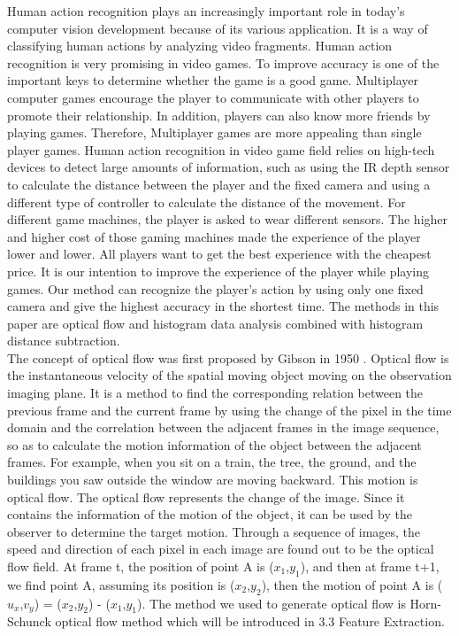 \documentclass[runningheads,a4paper]{llncs}
\begin{document}
	Human action recognition plays an increasingly important role in today’s computer vision development because of its various application. It is a way of classifying human actions by analyzing video fragments. Human action recognition is very promising in video games. To improve accuracy is one of the important keys to determine whether the game is a good game. Multiplayer computer games encourage the player to communicate with other players to promote their relationship. In addition, players can also know more friends by playing games. Therefore, Multiplayer games are more appealing than single player games. Human action recognition in video game field relies on high-tech devices to detect large amounts of information, such as using the IR depth sensor to calculate the distance between the player and the fixed camera and using a different type of controller to calculate the distance of the movement. For different game machines, the player is asked to wear different sensors. The higher and higher cost of those gaming machines made the experience of the player lower and lower. All players want to get the best experience with the cheapest price. It is our intention to improve the experience of the player while playing games. Our method can recognize the player’s action by using only one fixed camera and give the highest accuracy in the shortest time. The methods in this paper are optical flow and histogram data analysis combined with histogram distance subtraction.\\
	The concept of optical flow was first proposed by Gibson in 1950 \cite{2}. Optical flow is the instantaneous velocity of the spatial moving object moving on the observation imaging plane. It is a method to find the corresponding relation between the previous frame and the current frame by using the change of the pixel in the time domain and the correlation between the adjacent frames in the image sequence, so as to calculate the motion information of the object between the adjacent frames. For example, when you sit on a train, the tree, the ground, and the buildings you saw outside the window are moving backward. This motion is optical flow. The optical flow represents the change of the image. Since it contains the information of the motion of the object, it can be used by the observer to determine the target motion. Through a sequence of images, the speed and direction of each pixel in each image are found out to be the optical flow field. At frame t, the position of point A is ($x_{1}$,$y_{1}$), and then at frame t+1, we find point A, assuming its position is ($x_{2}$,$y_{2}$), then the motion of point A is ($u_{x}$,$v_{y}$) = ($x_{2}$,$y_{2}$) - ($x_{1}$,$y_{1}$). The method we used to generate optical flow is Horn-Schunck optical flow method\cite{3} which will be introduced in 3.3 Feature Extraction.
\end{document}
